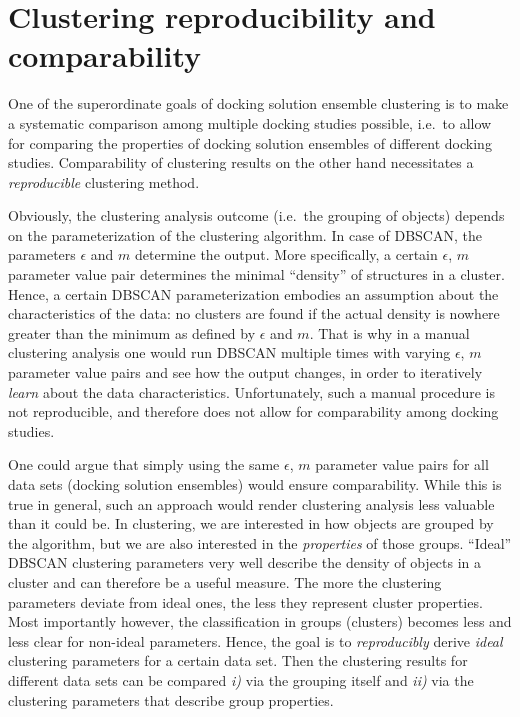 \section{Clustering reproducibility and comparability}
\label{clustering_param_opt}

One of the superordinate goals of docking solution ensemble clustering is to
make a systematic comparison among multiple docking studies possible, i.e.\ to
allow for comparing the properties of docking solution ensembles of different
docking studies. Comparability of clustering results on the other hand
necessitates a \textit{reproducible} clustering method.

Obviously, the clustering analysis outcome (i.e.\ the grouping of objects)
depends on the parameterization of the clustering algorithm. In case of DBSCAN,
the parameters $\epsilon$ and $m$ determine the output. More specifically, a
certain $\epsilon$, $m$ parameter value pair determines the minimal
\enquote{density} of structures in a cluster. Hence, a certain DBSCAN
parameterization embodies an assumption about the characteristics of the data:
no clusters are found if the actual density is nowhere greater than the minimum
as defined by $\epsilon$ and $m$. That is why in a manual clustering analysis
one would run DBSCAN multiple times with varying $\epsilon$, $m$ parameter value
pairs and see how the output changes, in order to iteratively \textit{learn}
about the data characteristics. Unfortunately, such a manual procedure is not
reproducible, and therefore does not allow for comparability among docking
studies.

One could argue that simply using the same $\epsilon$, $m$ parameter value pairs
for all data sets (docking solution ensembles) would ensure comparability. While
this is true in general, such an approach would render clustering analysis less
valuable than it could be. In clustering, we are interested in how objects are
grouped by the algorithm, but we are also interested in the \textit{properties}
of those groups. \enquote{Ideal} DBSCAN clustering parameters very well describe
the density of objects in a cluster and can therefore be a useful measure. The
more the clustering parameters deviate from ideal ones, the less they represent
cluster properties. Most importantly however, the classification in groups
(clusters) becomes less and less clear for non-ideal parameters. Hence, the goal
is to \textit{reproducibly} derive \textit{ideal} clustering parameters for a
certain data set. Then the clustering results for different data sets can be
compared \textit{i)} via the grouping itself and \textit{ii)} via the clustering
parameters that describe group properties.

